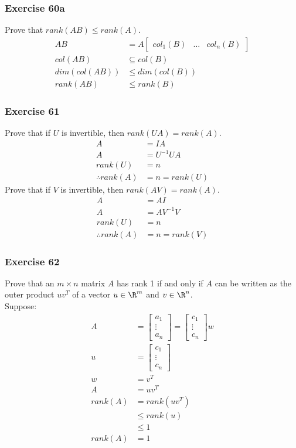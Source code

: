 \documentclass[letterpaper, 12pt]{math}
\begin{document}
\subsubsection*{Exercise 60a}
Prove that \( rank(AB)\le rank(A) \).
\begin{align*}
  AB &= A\begin{bmatrix}col_1(B) & \dots & col_n(B)\end{bmatrix} \\
  col(AB) &\subseteq col(B) \\
  dim(col(AB)) &\le dim(col(B)) \\
  rank(AB) &\le rank(B)
\end{align*}

\subsubsection*{Exercise 61}
Prove that if \( U \) is invertible, then \( rank(UA) = rank(A) \).
\begin{align*}
  A &= IA \\
  A &= U^{-1}UA \\
  rank(U) &= n \\
  \therefore rank(A) &= n = rank(U)
\end{align*}
Prove that if \( V \) is invertible, then \( rank(AV) = rank(A) \).
\begin{align*}
  A &= AI \\
  A &= AV^{-1}V \\
  rank(U) &= n \\
  \therefore rank(A) &= n = rank(V)
\end{align*}

\subsubsection*{Exercise 62}
Prove that an \( m\times n \) matrix \( A \) has rank 1 if and only if \( A \)
can be written as the outer product \( uv^T \) of a vector \( u\in\R^m \) and
\( v\in\R^n \). \\
Suppose:
\begin{align*}
  A &= \begin{bmatrix}a_1 \\ \vdots \\ a_n\end{bmatrix}
    = \begin{bmatrix}c_1 \\ \vdots \\ c_n\end{bmatrix}w \\
  u &= \begin{bmatrix}c_1 \\ \vdots \\ c_n\end{bmatrix} \\
  w &= v^T \\
  A &= uv^T \\
  rank(A) &= rank(uv^T) \\
  &\le rank(u) \\
  &\le 1 \\
  rank(A) &= 1
\end{align*}
\end{document}
